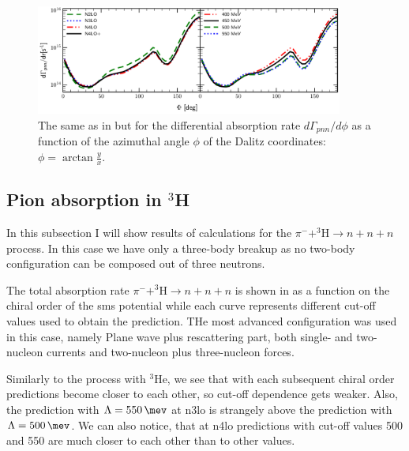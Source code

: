     \begin{figure}[h]
        \begin{center}
        \includegraphics[width=0.9\textwidth]{PlotData/PION/Dalitz_maps/figures/3HE_dGdphi.pdf}
        \end{center}
        \caption{The same as in  but for the differential absorption rate $d\Gamma_{pnn} /d\phi$
        as a function of the azimuthal angle $\phi$ of the Dalitz coordinates: $\phi = \arctan \frac{y}{x}$.}
        \label{pion_dGdphi}
    \end{figure}


    \clearpage
    \subsection{Pion absorption in $^3$H}

    In this subsection I will show results of calculations for
    the $\pi^- + ^3\text{H} \rightarrow n + n + n$ process.
    In this case we have only a three-body breakup as 
    no two-body configuration can be composed out of three neutrons.
    
    The total absorption rate $\pi^- + ^3\text{H} \rightarrow n + n + n$ is shown in 
    as a function on the chiral order of the \gls{sms} potential while each curve represents
    different cut-off values used to obtain the prediction. 
    THe most advanced configuration was used in this case, namely Plane wave plus rescattering part,
    both single- and two-nucleon currents and two-nucleon plus three-nucleon forces.

    Similarly to the process with $^3$He, we see that with each subsequent chiral order
    predictions become closer to each other, so cut-off dependence gets weaker.
    Also, the prediction with $\Lambda=\SI{550}{\mev}$ at \gls{n3lo} is
    strangely above the prediction with $\Lambda=\SI{500}{\mev}$.
    We can also notice, that at \gls{n4lo}
    predictions with cut-off values \SI{500}{\mev} and \SI{550}{\mev}
    are much closer to each other than to other values.

